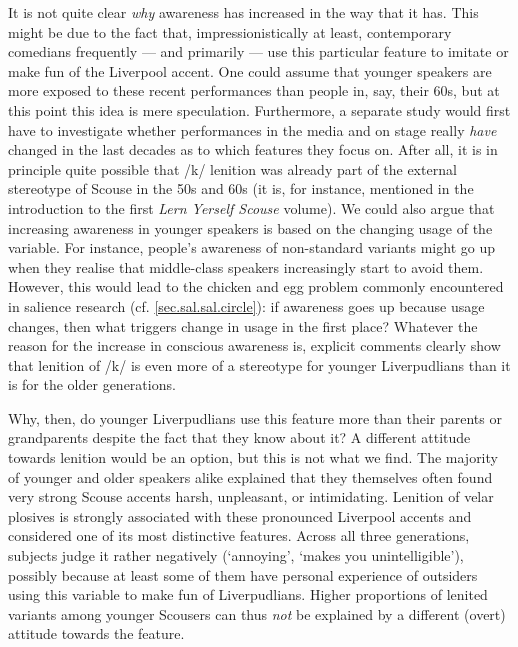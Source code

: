 It is not quite clear \emph{why} awareness has increased in the way that it has.
This might be due to the fact that, impressionistically at least, contemporary comedians frequently --- and primarily --- use this particular feature to imitate or make fun of the Liverpool accent.
One could assume that younger speakers are more exposed to these recent performances than people in, say, their 60s, but at this point this idea is mere speculation.
Furthermore, a separate study would first have to investigate whether performances in the media and on stage really \emph{have} changed in the last decades as to which features they focus on.
After all, it is in principle quite possible that /k/ lenition was already part of the external stereotype of Scouse in the 50s and 60s (it is, for instance, mentioned in the introduction to the first \emph{Lern Yerself Scouse} volume).
We could also argue that increasing awareness in younger speakers is based on the changing usage of the variable.
For instance, people's awareness of non-standard variants might go up when they realise that middle-class speakers increasingly start to avoid them.
However, this would lead to the chicken and egg problem commonly encountered in salience research (cf. \ref{sec.sal.sal.circle}): if awareness goes up because usage changes, then what triggers change in usage in the first place?
Whatever the reason for the increase in conscious awareness is, explicit comments clearly show that lenition of /k/ is even more of a stereotype for younger Liverpudlians than it is for the older generations.

Why, then, do younger Liverpudlians use this feature more than their parents or grandparents despite the fact that they know about it?
A different attitude towards lenition would be an option, but this is not what we find.
The majority of younger and older speakers alike explained that they themselves often found very strong Scouse accents harsh, unpleasant, or intimidating.
Lenition of velar plosives is strongly associated with these pronounced Liverpool accents and considered one of its most distinctive features.
Across all three generations, subjects judge it rather negatively (`annoying', `makes you unintelligible'), possibly because at least some of them have personal experience of outsiders using this variable to make fun of Liverpudlians.
Higher proportions of lenited variants among younger Scousers can thus \emph{not} be explained by a different (overt) attitude towards the feature.

